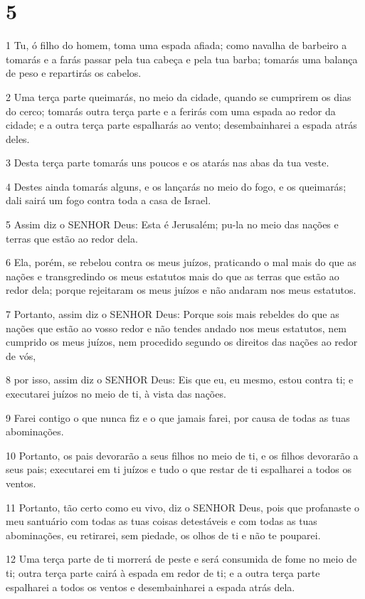 \chapter{5}

\par 1 Tu, ó filho do homem, toma uma espada afiada; como navalha de barbeiro a tomarás e a farás passar pela tua cabeça e pela tua barba; tomarás uma balança de peso e repartirás os cabelos.
\par 2 Uma terça parte queimarás, no meio da cidade, quando se cumprirem os dias do cerco; tomarás outra terça parte e a ferirás com uma espada ao redor da cidade; e a outra terça parte espalharás ao vento; desembainharei a espada atrás deles.
\par 3 Desta terça parte tomarás uns poucos e os atarás nas abas da tua veste.
\par 4 Destes ainda tomarás alguns, e os lançarás no meio do fogo, e os queimarás; dali sairá um fogo contra toda a casa de Israel.
\par 5 Assim diz o SENHOR Deus: Esta é Jerusalém; pu-la no meio das nações e terras que estão ao redor dela.
\par 6 Ela, porém, se rebelou contra os meus juízos, praticando o mal mais do que as nações e transgredindo os meus estatutos mais do que as terras que estão ao redor dela; porque rejeitaram os meus juízos e não andaram nos meus estatutos.
\par 7 Portanto, assim diz o SENHOR Deus: Porque sois mais rebeldes do que as nações que estão ao vosso redor e não tendes andado nos meus estatutos, nem cumprido os meus juízos, nem procedido segundo os direitos das nações ao redor de vós,
\par 8 por isso, assim diz o SENHOR Deus: Eis que eu, eu mesmo, estou contra ti; e executarei juízos no meio de ti, à vista das nações.
\par 9 Farei contigo o que nunca fiz e o que jamais farei, por causa de todas as tuas abominações.
\par 10 Portanto, os pais devorarão a seus filhos no meio de ti, e os filhos devorarão a seus pais; executarei em ti juízos e tudo o que restar de ti espalharei a todos os ventos.
\par 11 Portanto, tão certo como eu vivo, diz o SENHOR Deus, pois que profanaste o meu santuário com todas as tuas coisas detestáveis e com todas as tuas abominações, eu retirarei, sem piedade, os olhos de ti e não te pouparei.
\par 12 Uma terça parte de ti morrerá de peste e será consumida de fome no meio de ti; outra terça parte cairá à espada em redor de ti; e a outra terça parte espalharei a todos os ventos e desembainharei a espada atrás dela.
